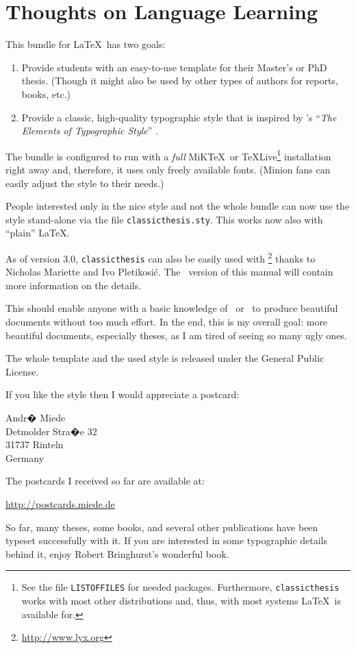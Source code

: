 \chapter{Thoughts on Language Learning}\label{ch:thoughts}
This bundle for \LaTeX\ has two goals:
\begin{enumerate}
    \item Provide students with an easy-to-use template for their
    Master's
    or PhD thesis. (Though it might also be used by other types of
    authors
    for reports, books, etc.)
    \item Provide a classic, high-quality typographic style that is
    inspired by \citeauthor{bringhurst:2002}'s ``\emph{The Elements of
    Typographic Style}'' \citep{bringhurst:2002}.
    \marginpar{\myTitle \myVersion}
\end{enumerate}
The bundle is configured to run with a \emph{full} 
MiK\TeX\ or \TeX Live\footnote{See the file \texttt{LISTOFFILES} for
needed packages. Furthermore, \texttt{classicthesis} 
works with most other distributions and, thus, with most systems 
\LaTeX\ is available for.} 
installation right away and, therefore, it uses only freely available 
fonts. (Minion fans can easily adjust the style to their needs.)

People interested only in the nice style and not the whole bundle can
now use the style stand-alone via the file \texttt{classicthesis.sty}.
This works now also with ``plain'' \LaTeX.

As of version 3.0, \texttt{classicthesis} can also be easily used with 
\mLyX\footnote{\url{http://www.lyx.org}} thanks to Nicholas Mariette 
and Ivo Pletikosi\'c. The \mLyX\ version of this manual will contain
more information on the details.

This should enable anyone with a basic knowledge of \LaTeXe\ or \mLyX\ to
produce beautiful documents without too much effort. In the end, this
is my overall goal: more beautiful documents, especially theses, as I
am tired of seeing so many ugly ones.

The whole template and the used style is released under the
 General Public License. 

If you like the style then I would appreciate a postcard:
\begin{center}
 Andr� Miede \\
 Detmolder Stra�e 32 \\
 31737 Rinteln \\
 Germany
\end{center}
The postcards I received so far are available at:
\begin{center}
 \url{http://postcards.miede.de}
\end{center}
So far, many theses, some books, and several other publications have 
been typeset successfully with it. If you are interested in some
typographic details behind it, enjoy Robert Bringhurst's wonderful book.

